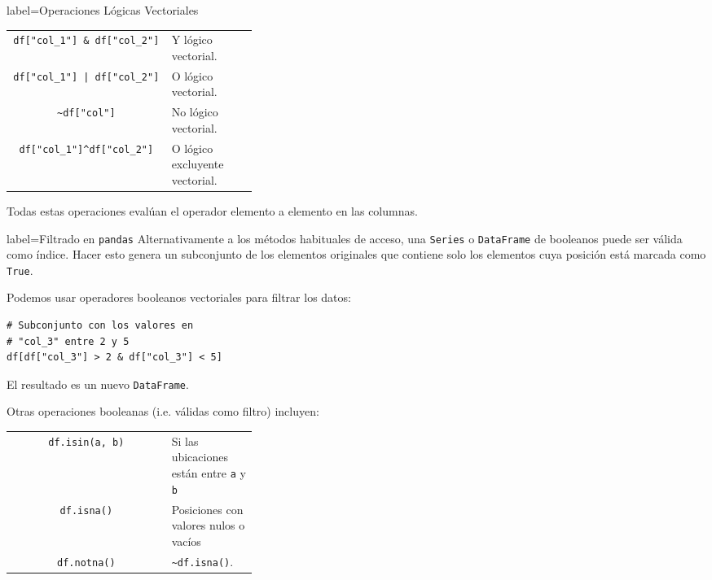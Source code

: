 \begin{contentbox}{label=Operaciones Lógicas Vectoriales}
    \begin{tabular}{C|p{0.35\linewidth}}
        \lstinline!df["col_1"] & df["col_2"]! & Y lógico vectorial. \\
        \lstinline!df["col_1"] | df["col_2"]! &  O lógico vectorial. \\
        \lstinline!~df["col"]! &  No lógico vectorial. \\
        \lstinline!df["col_1"]^df["col_2"]! & O lógico excluyente vectorial.
    \end{tabular}
    
    Todas estas operaciones evalúan el operador elemento a elemento en las columnas.
\end{contentbox}

\begin{contentbox}{label=Filtrado en \texttt{pandas}}
    Alternativamente a los métodos habituales de acceso, una \texttt{Series} o \texttt{DataFrame} de booleanos puede ser válida como índice. Hacer esto genera un subconjunto de los elementos originales que contiene solo los elementos cuya posición está marcada como \lstinline!True!.
    
    Podemos usar operadores booleanos vectoriales para filtrar los datos:
    \begin{lstlisting}
# Subconjunto con los valores en 
# "col_3" entre 2 y 5
df[df["col_3"] > 2 & df["col_3"] < 5]
    \end{lstlisting}

    El resultado es un nuevo \texttt{DataFrame}.
    
    Otras operaciones booleanas (i.e. válidas como filtro) incluyen:
    
    \begin{tabular}{C|p{0.35\linewidth}}
        \lstinline!df.isin(a, b)! & Si las ubicaciones están entre \texttt{a} y \texttt{b} \\
        \lstinline!df.isna()! &  Posiciones con valores nulos o vacíos \\
        \lstinline!df.notna()! &  \lstinline!~df.isna()!. \\
    \end{tabular}
\end{contentbox}

